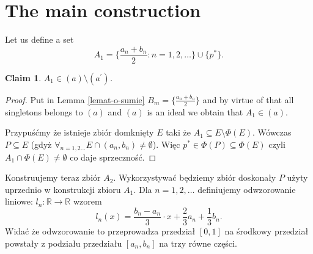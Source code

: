 \documentclass[12pt]{amsart}
\theoremstyle{plain}
\newtheorem{claim}[theorem]{Claim}
\theoremstyle{definition}
\theoremstyle{remark}
\newcommand{\real}{\mathbb{R}}
\newcommand{\aideal}{\mathit{(a)}}
\newcommand{\aidealprime}{\mathit{(a^\prime)}}
\begin{document}
\section{The main construction}

Let us define a set
\[ A_1 = \lbrace \frac{a_n + b_n}{2} \colon n = 1,2,\ldots\rbrace \cup \lbrace p^* \rbrace.
\]

\begin{claim}
  $A_1 \in \aideal \setminus \aidealprime$.
\end{claim}  
\begin{proof}
Put in Lemma \ref{lemat-o-sumie} 
$B_m = \lbrace \frac{a_n + b_n}{2} \rbrace$
and by virtue of that all singletons belongs to
$\aideal$ and $\aideal$
is an ideal we obtain that $A_1 \in \aideal$.

\smallskip

Przypuśćmy że istnieje zbiór domknięty $E$ taki że
$A_1 \subseteq E \setminus \Phi(E)$.
Wówczas $P \subseteq E$ (gdyż $\forall_{n=1,2\ldots} E \cap (a_n, b_n) \not= \emptyset$).
Więc $p^* \in \Phi(P) \subseteq \Phi(E)$ czyli $A_1 \cap \Phi(E) \not= \emptyset$
co daje sprzeczność.
\end{proof}

Konstruujemy teraz zbiór $A_2$.
Wykorzystywać będziemy zbiór doskonały $P$
użyty uprzednio w konstrukcji zbioru $A_1$.
Dla $n = 1,2,\ldots$ definiujemy odwzorowanie liniowe:
$l_n\colon \real\to\real$ wzorem
\[l_n(x) = \frac{b_n - a_n}{3} \cdot x + \frac{2}{3} a_n + \frac{1}{3} b_n.\]
Widać że odwzorowanie to przeprowadza przedział $[0,1]$ na
środkowy przedział powstały z podziału przedziału $[a_n, b_n]$ na trzy
równe części.
\end{document}
